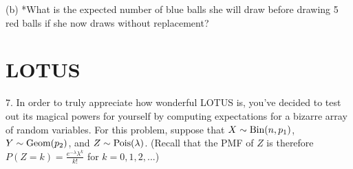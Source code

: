 \documentclass{article}
\begin{document}
(b) *What is the expected number of blue balls she will draw before drawing 5 red balls if she now draws without replacement?



\section{LOTUS}

7. In order to truly appreciate how wonderful LOTUS is, you've decided to test out its magical powers for yourself by computing expectations for a bizarre array of random variables. For this problem, suppose that $X \sim \textrm{Bin}(n, p_1)$, $Y \sim \textrm{Geom}(p_2)$, and $Z \sim \textrm{Pois}(\lambda)$. (Recall that the PMF of $Z$ is therefore $P(Z = k) = \frac{e^{-\lambda} \lambda^k}{k!}$ for $k = 0, 1, 2, ...$)
\end{document}
